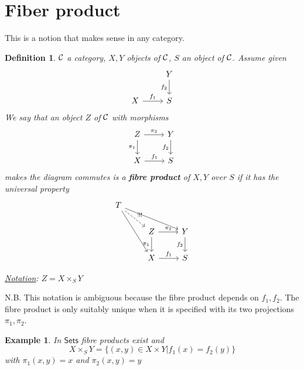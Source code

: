 \documentclass[11pt]{article}
\newtheorem{dfn}[thm]{Definition}
\newtheorem{ex}[thm]{Example}
\newcommand{\calc}{{\cal C}}
\begin{document}
\section{Fiber product}
This is a notion that makes sense in any category.
\begin{dfn}
$\calc$ a category, $X,Y$ objects of $\calc$, $S$ an object of $\calc$. Assume given
$$
\begin{tikzcd}
 & Y \arrow[d, "f_2"'] \\
X \arrow[r, "f_1"] & S
\end{tikzcd}
$$
We say that an object $Z$ of $\calc$ with morphisms 
$$
\begin{tikzcd}
Z \arrow[r, "\pi_2"] \arrow[d, "\pi_1"'] & Y \arrow[d, "f_2"'] \\
X \arrow[r, "f_1"] & S
\end{tikzcd}
$$
makes the diagram commutes is a \textbf{fibre product} of $X,Y$ over $S$ if it has the universal property
$$
\begin{tikzcd}
T \arrow[rdd] \arrow[rrd] \arrow[rd, "\exists!", dashed] &  &  \\
 & Z \arrow[r, "\pi_2"] \arrow[d, "\pi_1"'] & Y \arrow[d, "f_2"'] \\
 & X \arrow[r, "f_1"] & S
\end{tikzcd}
$$

\underline{Notation}: $Z=X\times_S Y$
\end{dfn}
N.B. This notation is ambiguous because the fibre product depends on $f_1,f_2$. The fibre product is only suitably unique when it is specified with its two projections $\pi_1,\pi_2$.
\begin{ex}
In $\mathsf{Sets}$ fibre products exist and
$$
X\times_S Y=\{(x,y)\in X\times Y|f_1(x)=f_2(y)\}
$$
with $\pi_1(x,y)=x$ and $\pi_2(x,y)=y$
\end{ex}
\end{document}
